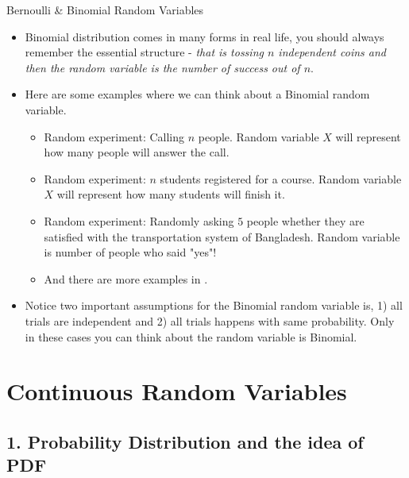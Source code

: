 \documentclass[8pt, usepdftitle = false]{beamer}
\begin{document}
\begin{frame}[allowframebreaks]{Bernoulli \& Binomial Random Variables}
\begin{itemize}
\item Binomial distribution comes in many forms in real life, you should always remember the essential structure - \emph{that is tossing $n$ independent coins and then the random variable is the number of success out of $n$}.

\item Here are some examples where we can think about a Binomial random variable.

\begin{itemize}
\item  Random experiment: Calling $n$ people. Random variable $X$ will represent how many people will answer the call.

\item Random experiment: $n$ students registered for a course. Random variable $X$ will represent how many students will finish it.

\item Random experiment: Randomly asking $5$ people whether they are satisfied with the transportation system of Bangladesh. Random variable is number of people who said "yes"! 

\item And there are more examples in \cite{anderson_statistics_2020}.


\end{itemize}

\item Notice two important assumptions for the Binomial random variable is, 1) all trials are independent and 2) all trials happens with same probability. Only in these cases you can think about the random variable is Binomial.



\end{itemize}


\end{frame}

 


\section{Continuous Random Variables}
\frame{\sectionpage}

\subsection{1. Probability Distribution and the idea of PDF}
\frame{\subsectionpage}
\end{document}
